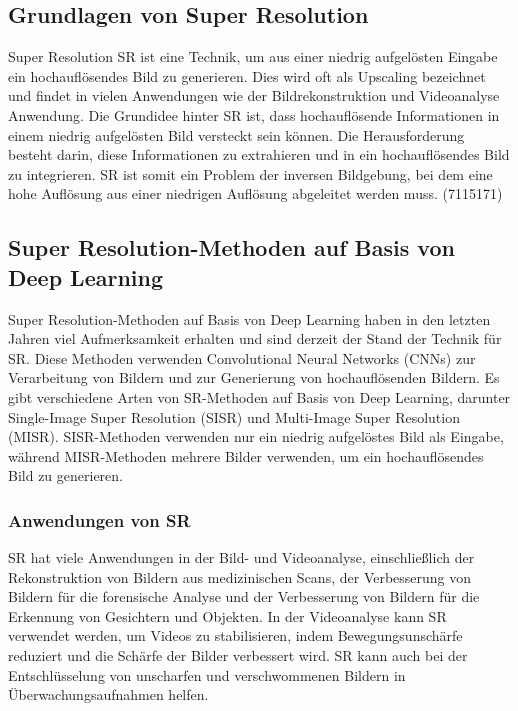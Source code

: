     \subsection{Grundlagen von Super Resolution }
    
        Super Resolution \ac{SR} ist eine Technik, um aus einer niedrig aufgelösten Eingabe ein hochauflösendes Bild zu generieren.      
        Dies wird oft als Upscaling bezeichnet und findet in vielen Anwendungen wie der Bildrekonstruktion und Videoanalyse Anwendung.
        Die Grundidee hinter SR ist, dass hochauflösende Informationen in einem niedrig aufgelösten Bild versteckt sein können.      
        Die Herausforderung besteht darin, diese Informationen zu extrahieren und in ein hochauflösendes Bild zu integrieren.      
        SR ist somit ein Problem der inversen Bildgebung, bei dem eine hohe Auflösung aus einer niedrigen Auflösung abgeleitet werden muss.
        \footfullcite(7115171)
    \subsection{Super Resolution-Methoden auf Basis von Deep Learning}
    
        Super Resolution-Methoden auf Basis von Deep Learning haben in den letzten Jahren viel Aufmerksamkeit erhalten und sind derzeit der Stand der Technik für SR.      
        Diese Methoden verwenden Convolutional Neural Networks (CNNs) zur Verarbeitung von Bildern und zur Generierung von hochauflösenden Bildern.
        Es gibt verschiedene Arten von SR-Methoden auf Basis von Deep Learning, darunter Single-Image Super Resolution (SISR) und Multi-Image Super Resolution (MISR).      
        SISR-Methoden verwenden nur ein niedrig aufgelöstes Bild als Eingabe, während MISR-Methoden mehrere Bilder verwenden, um ein hochauflösendes Bild zu generieren.
    
    \subsubsection{Anwendungen von SR}
    
        SR hat viele Anwendungen in der Bild- und Videoanalyse, einschließlich der Rekonstruktion von Bildern aus medizinischen Scans, der Verbesserung von Bildern für die forensische Analyse und der Verbesserung von Bildern für die Erkennung von Gesichtern und Objekten.
        In der Videoanalyse kann SR verwendet werden, um Videos zu stabilisieren, indem Bewegungsunschärfe reduziert und die Schärfe der Bilder verbessert wird.      
        SR kann auch bei der Entschlüsselung von unscharfen und verschwommenen Bildern in Überwachungsaufnahmen helfen.
    
